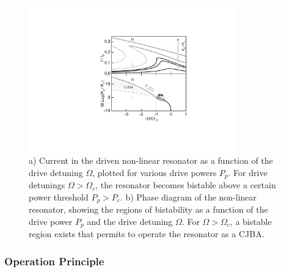 \begin{figure}	
	\includegraphics[width=9cm]{"./material/figures/introduction/jba_phasediagram"}
	\caption{a) Current in the driven non-linear resonator as a function of the drive detuning $\Omega$, plotted for various drive powers $P_p$. For drive detunings $\Omega > \Omega_c$, the resonator becomes bistable above a certain power threshold $P_p>P_c$. b) Phase diagram of the non-linear resonator, showing the regions of bistability as a function of the drive power $P_p$ and the drive detuning $\Omega$. For $\Omega>\Omega_c$, a bistable region exists that permits to operate the resonator as a CJBA.}
	\label{fig:jba_curves}
\end{figure}

\subsubsection{Operation Principle} \label{section:jba_operation_principle}

